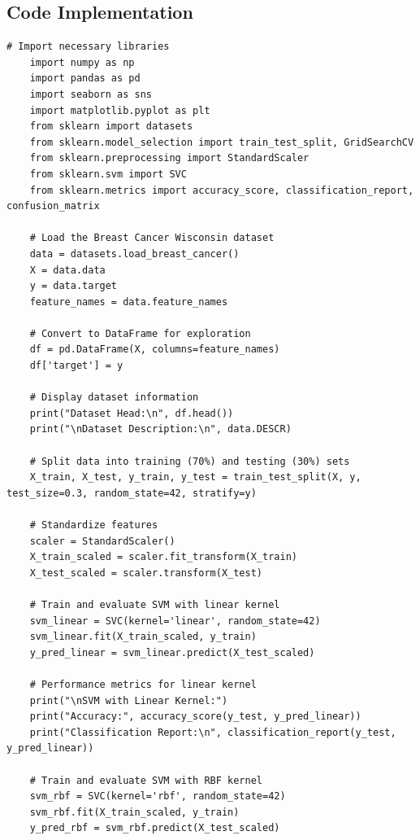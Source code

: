 \documentclass[a4paper,12pt]{article}
\begin{document}
\newpage
\subsection{Code Implementation}

\begin{lstlisting}[style=python]
    # Import necessary libraries
    import numpy as np
    import pandas as pd
    import seaborn as sns
    import matplotlib.pyplot as plt
    from sklearn import datasets
    from sklearn.model_selection import train_test_split, GridSearchCV
    from sklearn.preprocessing import StandardScaler
    from sklearn.svm import SVC
    from sklearn.metrics import accuracy_score, classification_report, confusion_matrix
    
    # Load the Breast Cancer Wisconsin dataset
    data = datasets.load_breast_cancer()
    X = data.data
    y = data.target
    feature_names = data.feature_names
    
    # Convert to DataFrame for exploration
    df = pd.DataFrame(X, columns=feature_names)
    df['target'] = y
    
    # Display dataset information
    print("Dataset Head:\n", df.head())
    print("\nDataset Description:\n", data.DESCR)
    
    # Split data into training (70%) and testing (30%) sets
    X_train, X_test, y_train, y_test = train_test_split(X, y, test_size=0.3, random_state=42, stratify=y)
    
    # Standardize features
    scaler = StandardScaler()
    X_train_scaled = scaler.fit_transform(X_train)
    X_test_scaled = scaler.transform(X_test)
    
    # Train and evaluate SVM with linear kernel
    svm_linear = SVC(kernel='linear', random_state=42)
    svm_linear.fit(X_train_scaled, y_train)
    y_pred_linear = svm_linear.predict(X_test_scaled)
    
    # Performance metrics for linear kernel
    print("\nSVM with Linear Kernel:")
    print("Accuracy:", accuracy_score(y_test, y_pred_linear))
    print("Classification Report:\n", classification_report(y_test, y_pred_linear))
    
    # Train and evaluate SVM with RBF kernel
    svm_rbf = SVC(kernel='rbf', random_state=42)
    svm_rbf.fit(X_train_scaled, y_train)
    y_pred_rbf = svm_rbf.predict(X_test_scaled)
    

\end{lstlisting}
\end{document}
